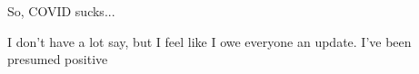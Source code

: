 So, COVID sucks...

I don't have a lot say, but I feel like I owe everyone an update. I've been presumed positive